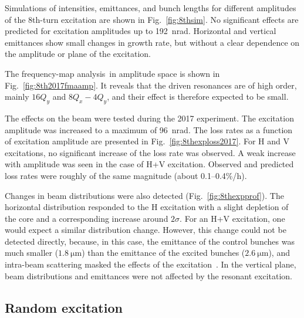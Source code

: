 \documentclass[aps
,prstab
,reprint
,longbibliography
,preprintnumbers
,showkeys
,amsfonts,amssymb,amsmath
,floatfix
]{revtex4-1}
\newcommand{\q}[2]{\ensuremath{#1\ \mathrm{#2}}} %
\newcommand{\fma}{frequency-map analysis}
\begin{document}
Simulations of intensities, emittances, and bunch lengths for
different amplitudes of the 8th-turn excitation are shown in
Fig.~\ref{fig:8thsim}. No significant effects are predicted for
excitation amplitudes up to 192~nrad. Horizontal and vertical
emittances show small changes in growth rate, but without a clear
dependence on the amplitude or plane of the excitation.

The \fma\ in amplitude space is shown in
Fig.~\ref{fig:8th2017fmaamp}. It reveals that the driven resonances
are of high order, mainly $16 Q_y$ and \mbox{$8 Q_x - 4 Q_y$}, and
their effect is therefore expected to be small.

The effects on the beam were tested during the 2017 experiment. The
excitation amplitude was increased to a maximum of 96~nrad. The loss
rates as a function of excitation amplitude are presented in
Fig.~\ref{fig:8thexploss2017}. For H and V excitations, no significant
increase of the loss rate was observed. A weak increase with amplitude
was seen in the case of H+V excitation. Observed and predicted loss
rates were roughly of the same magnitude (about 0.1--0.4\%/h).

Changes in beam distributions were also detected
(Fig.~\ref{fig:8thexpprof}). The horizontal distribution responded to
the H excitation with a slight depletion of the core and a
corresponding increase around $2\sigma$. For an H+V excitation, one
would expect a similar distribution change. However, this change could
not be detected directly, because, in this case, the emittance of the
control bunches was much smaller (\q{1.8}{\mu m}) than the emittance
of the excited bunches (\q{2.6}{\mu m}), and intra-beam scattering
masked the effects of the excitation~\cite{resexmd2017}. In the
vertical plane, beam distributions and emittances were not affected
by the resonant excitation.



\subsection{Random excitation}
\label{sec:simexran}
\end{document}
